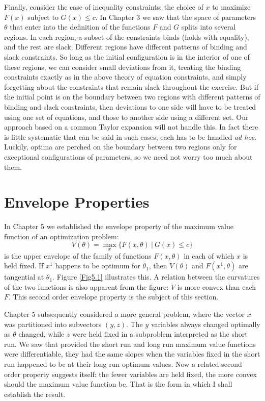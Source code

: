 Finally, consider the case of inequality constraints: the choice of $x$ to maximize $F(x)$ subject to $G(x) \leq c$. In Chapter 3 we saw that the space of parameters $\theta$ that enter into the definition of the functions $F$ and $G$ splits into several regions. In each region, a subset of the constraints binds (holds with equality), and the rest are slack. Different regions have different patterns of binding and slack constraints. So long as the initial configuration is in the interior of one of these regions, we can consider small deviations from it, treating the binding constraints exactly as in the above theory of equation constraints, and simply forgetting about the constraints that remain slack throughout the exercise. But if the initial point is on the boundary between two regions with different patterns of binding and slack constraints, then deviations to one side will have to be treated using one set of equations, and those to another side using a different set. Our approach based on a common Taylor expansion will not handle this. In fact there is little systematic that can be said in such cases; each has to be handled \textit{ad hoc}. Luckily, optima are perched on the boundary between two regions only for exceptional configurations of parameters, so we need not worry too much about them.

\section*{Envelope Properties}

In Chapter 5 we established the envelope property of the maximum value function of an optimization problem:
\begin{equation*}
V(\theta) = \max\limits_x \{ F(x,\theta) \ | \  G(x) \leq c \}
\end{equation*}
is the upper envelope of the family of functions $F(x, \theta)$ in each of which $x$ is held fixed. If $x^1$ happens to be optimum for $\theta_1$, then $V(\theta)$ and $F(x^1, \theta)$ are tangential at $\theta_1$. Figure \ref{Fig5.1} illustrates this. A relation between the curvatures of the two functions is also apparent from the figure: $V$ is more convex than each $F$. This second order envelope property is the subject of this section.

Chapter 5 subsequently considered a more general problem, where the vector $x$ was partitioned into subvectors $(y,z)$. The $y$ variables always changed optimally as $\theta$ changed, while $z$ were held fixed in a subproblem interpreted as the short run. We saw that provided the short run and long run maximum value functions were differentiable, they had the same slopes when the variables fixed in the short run happened to be at their long run optimum values. Now a related second order property suggests itself: the fewer variables are held fixed, the more convex should the maximum value function be. That is the form in which I shall establish the result.

